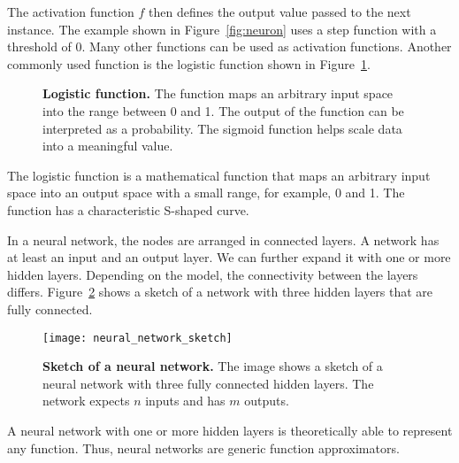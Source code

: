 The activation function $f$ then defines the output value passed to the next instance. The example shown in Figure~\ref{fig:neuron} uses a step function with a threshold of 0. Many other functions can be used as activation functions. Another commonly used function is the logistic function shown in Figure~\ref{fig:sigmoid}.
\begin{figure}[ht]
\centering
{}
\caption[Logistic function]{
 \textbf{Logistic function.}
 The function maps an arbitrary input space into the range between 0 and 1. The output of the function can be interpreted as a probability. The sigmoid function helps scale data into a meaningful value.
}
\label{fig:sigmoid}
\end{figure}
The logistic function is a mathematical function that maps an arbitrary input space into an output space with a small range, for example, 0 and 1. The function has a characteristic S-shaped curve.

In a neural network, the nodes are arranged in connected layers. A network has at least an input and an output layer. We can further expand it with one or more hidden layers. Depending on the model, the connectivity between the layers differs. Figure~\ref{fig:neural_network_sketch} shows a sketch of a network with three hidden layers that are fully connected.
\begin{figure}[ht]
\centering
\texttt{[image: neural\_network\_sketch]}
\caption[Sketch of a neural network]{
  \textbf{Sketch of a neural network.}
  The image shows a sketch of a neural network with three fully connected hidden layers. The network expects $n$ inputs and has $m$ outputs.
}
\label{fig:neural_network_sketch}
\end{figure}
A neural network with one or more hidden layers is theoretically able to represent any function. Thus, neural networks are generic function approximators.

